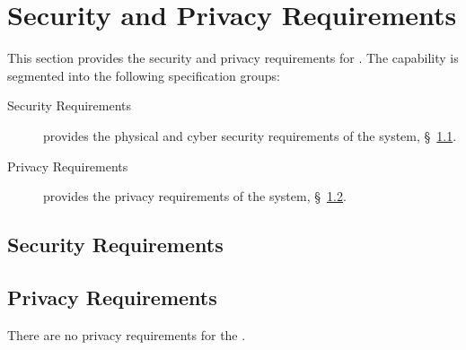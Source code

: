 \KNEADSECTIONNEWPAGE
\section{Security and Privacy Requirements}
\label{lab:sec_SecurityPrivacy}
% 

This section provides the security and privacy requirements for \ThisSys. 
The \ThisSys capability is segmented into the following specification groups:

\begin{description}
	\item [Security Requirements] provides the physical and cyber security requirements of the system, \S~\ref{lab:ssec_Security}.
	\item [Privacy Requirements] provides the privacy requirements of the system, \S~\ref{lab:ssec_Privacy}.
\end{description}

\KNEADSUBSECTIONNEWPAGE
\subsection{Security Requirements}
\label{lab:ssec_Security}




\KNEADSUBSECTIONNEWPAGE
\subsection{Privacy Requirements}
\label{lab:ssec_Privacy}

There are no privacy requirements for the \ThisSystem.